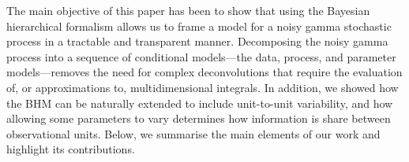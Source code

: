 \documentclass{article}
\begin{document}
%

The main objective of this paper has been to show that using the Bayesian hierarchical formalism allows us to frame a model for a noisy gamma stochastic process in a tractable and transparent manner. Decomposing the noisy gamma process into a sequence of conditional models---the data, process, and parameter models---removes the need for complex deconvolutions that require the evaluation of, or approximations to, multidimensional integrals. In addition, we showed how the BHM can be naturally extended to include unit-to-unit variability, and how allowing some parameters to vary determines how information is share between observational units. Below, we summarise the main elements of our work and highlight its contributions.
\end{document}
